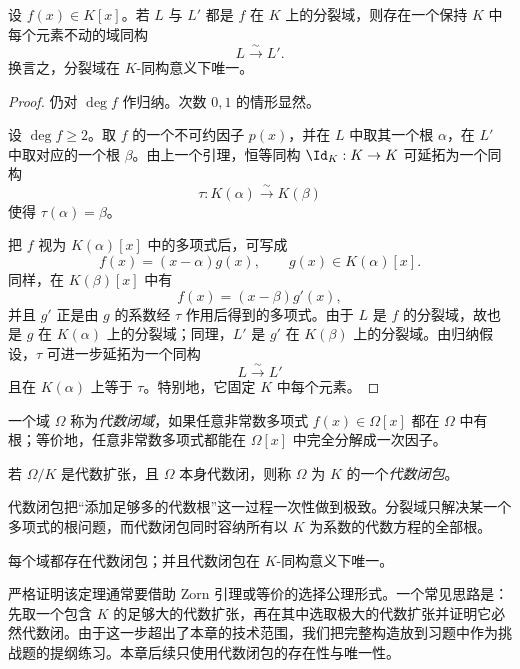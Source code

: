 \begin{theorem}[分裂域的唯一性]
设 $f(x)\in K[x]$。若 $L$ 与 $L'$ 都是 $f$ 在 $K$ 上的分裂域，则存在一个保持 $K$ 中每个元素不动的域同构
\[
L\xrightarrow{\sim}L'.
\]
换言之，分裂域在 $K$-同构意义下唯一。
\end{theorem}

\begin{proof}
仍对 $\deg f$ 作归纳。次数 $0,1$ 的情形显然。

设 $\deg f\ge2$。取 $f$ 的一个不可约因子 $p(x)$，并在 $L$ 中取其一个根 $\alpha$，在 $L'$ 中取对应的一个根 $\beta$。由上一个引理，恒等同构 $\Id_K:K\to K$ 可延拓为一个同构
\[
\tau:K(\alpha)\xrightarrow{\sim}K(\beta)
\]
使得 $\tau(\alpha)=\beta$。

把 $f$ 视为 $K(\alpha)[x]$ 中的多项式后，可写成
\[
f(x)=(x-\alpha)g(x),\qquad g(x)\in K(\alpha)[x].
\]
同样，在 $K(\beta)[x]$ 中有
\[
f(x)=(x-\beta)g'(x),
\]
并且 $g'$ 正是由 $g$ 的系数经 $\tau$ 作用后得到的多项式。由于 $L$ 是 $f$ 的分裂域，故也是 $g$ 在 $K(\alpha)$ 上的分裂域；同理，$L'$ 是 $g'$ 在 $K(\beta)$ 上的分裂域。由归纳假设，$\tau$ 可进一步延拓为一个同构
\[
L\xrightarrow{\sim}L'
\]
且在 $K(\alpha)$ 上等于 $\tau$。特别地，它固定 $K$ 中每个元素。
\end{proof}

\begin{definition}
一个域 $\Omega$ 称为\emph{代数闭域}，如果任意非常数多项式 $f(x)\in\Omega[x]$ 都在 $\Omega$ 中有根；等价地，任意非常数多项式都能在 $\Omega[x]$ 中完全分解成一次因子。

若 $\Omega/K$ 是代数扩张，且 $\Omega$ 本身代数闭，则称 $\Omega$ 为 $K$ 的一个\emph{代数闭包}。
\end{definition}

\begin{remark}
代数闭包把“添加足够多的代数根”这一过程一次性做到极致。分裂域只解决某一个多项式的根问题，而代数闭包同时容纳所有以 $K$ 为系数的代数方程的全部根。
\end{remark}

\begin{theorem}
每个域都存在代数闭包；并且代数闭包在 $K$-同构意义下唯一。
\end{theorem}

\begin{remark}
严格证明该定理通常要借助 Zorn 引理或等价的选择公理形式。一个常见思路是：先取一个包含 $K$ 的足够大的代数扩张，再在其中选取极大的代数扩张并证明它必然代数闭。由于这一步超出了本章的技术范围，我们把完整构造放到习题中作为挑战题的提纲练习。本章后续只使用代数闭包的存在性与唯一性。
\end{remark}

